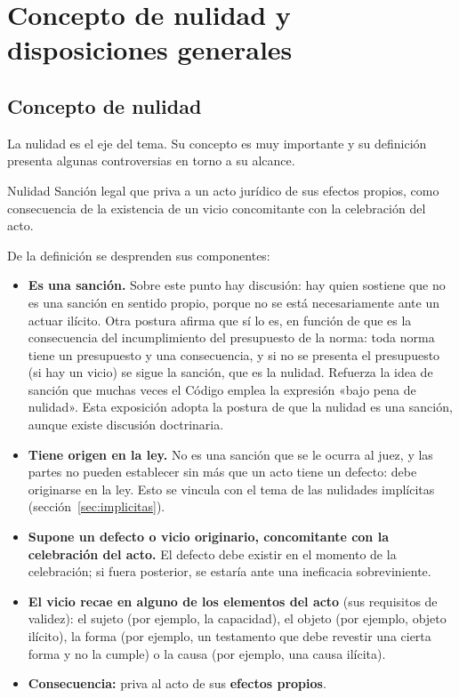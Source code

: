 \documentclass[12pt,oneside]{book}
\begin{document}
\chapter[Concepto de nulidad]{Concepto de nulidad y disposiciones generales}

\section{Concepto de nulidad}

La nulidad es el eje del tema. Su concepto es muy importante y su definición presenta algunas controversias en torno a su alcance.

\begin{definition}{Nulidad}
Sanción legal que priva a un acto jurídico de sus efectos propios, como consecuencia de la existencia de un vicio concomitante con la celebración del acto.
\end{definition}

De la definición se desprenden sus componentes:

\begin{itemize}
    \item \textbf{Es una sanción.} Sobre este punto hay discusión: hay quien sostiene que no es una sanción en sentido propio, porque no se está necesariamente ante un actuar ilícito. Otra postura afirma que sí lo es, en función de que es la consecuencia del incumplimiento del presupuesto de la norma: toda norma tiene un presupuesto y una consecuencia, y si no se presenta el presupuesto (si hay un vicio) se sigue la sanción, que es la nulidad. Refuerza la idea de sanción que muchas veces el Código emplea la expresión «bajo pena de nulidad». Esta exposición adopta la postura de que la nulidad es una sanción, aunque existe discusión doctrinaria.
    \item \textbf{Tiene origen en la ley.} No es una sanción que se le ocurra al juez, y las partes no pueden establecer sin más que un acto tiene un defecto: debe originarse en la ley. Esto se vincula con el tema de las nulidades implícitas (sección~\ref{sec:implicitas}).
    \item \textbf{Supone un defecto o vicio originario, concomitante con la celebración del acto.} El defecto debe existir en el momento de la celebración; si fuera posterior, se estaría ante una ineficacia sobreviniente.
    \item \textbf{El vicio recae en alguno de los elementos del acto} (sus requisitos de validez): el sujeto (por ejemplo, la capacidad), el objeto (por ejemplo, objeto ilícito), la forma (por ejemplo, un testamento que debe revestir una cierta forma y no la cumple) o la causa (por ejemplo, una causa ilícita).
    \item \textbf{Consecuencia:} priva al acto de sus \textbf{efectos propios}.
\end{itemize}
\end{document}
